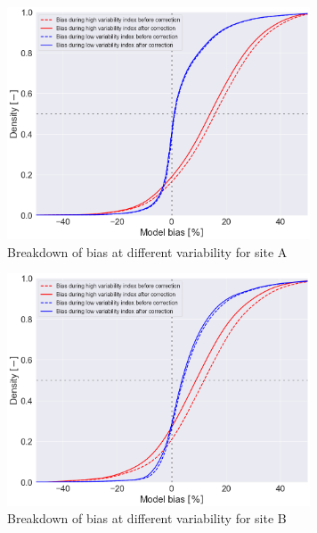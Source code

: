 \documentclass[conference]{IEEEtran}
\begin{document}
\begin{itemize}
\begin{figure}[htbp]
\centerline{\includegraphics[width=9cm]{DCS_ModelBias_breakdown_CDF.png}}
\caption{Breakdown of bias at different variability for site A}
\label{fig:irradiance-and-power}
\end{figure}

\begin{figure}[htbp]
\centerline{\includegraphics[width=9cm]{PAW_ModelBias_breakdown_CDF.png}}
\caption{Breakdown of bias at different variability for site B}
\label{fig:irradiance-and-power}
\end{figure}


\end{itemize}
\end{document}
